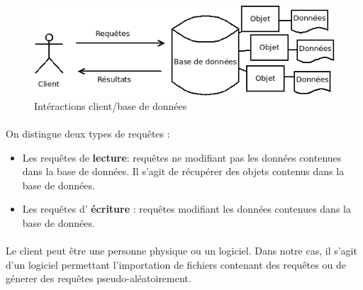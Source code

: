\documentclass[12pt]{article}
\begin{document}
\begin{figure}[h]
	\centering
		\includegraphics[width=12cm]{bd.png}
	\caption{Intéractions client/base de données \label{fig:bd}}
\end{figure}


\paragraph{} On distingue deux types de requêtes :
\begin{itemize}
 \item Les requêtes de \textbf{lecture}: requêtes ne modifiant pas les données contenues dans la base de données.
 Il s'agit de récupérer des objets contenus dans la base de données.
 
 \item Les requêtes d' \textbf{écriture} : requêtes modifiant les données contenues dans la base de données.
\end{itemize}

\paragraph{} Le client peut être une personne physique ou un logiciel. Dans notre cas, il s'agit d'un logiciel permettant l'importation de fichiers contenant des requêtes ou de génerer des requêtes pseudo-aléatoirement.



\end{document}
